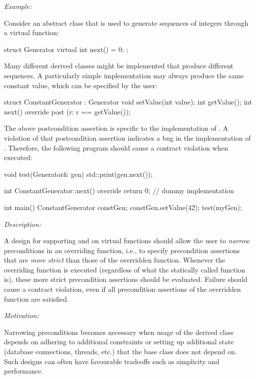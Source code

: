 \emph{Example:}

Consider an abstract class that is used to generate sequences of integers through a virtual function:

\begin{codeblock}
struct Generator {
  virtual int next() = 0;
};
\end{codeblock}
Many different derived classes might be implemented that produce different sequences. A particularly simple implementation may always produce the same constant value, which can be specified by the user:
\begin{codeblock}
struct ConstantGenerator : Generator {
  void setValue(int value);
  int getValue(); 
  int next() override
    post (r: r == getValue());
}
\end{codeblock}
The above postcondition assertion is specific to the implementation of \allowbreak{}. A violation of that postcondition assertion indicates a bug in the implementation of . Therefore, the following program should cause a contract violation when executed:
\begin{codeblock}
void test(Generator& gen) {
  std::print(gen.next());
}

int ConstantGenerator::next() override {
  return 0;  // dummy implementation  
} 

int main() {
  ConstantGenerator constGen;
  constGen.setValue(42);
  test(myGen);
}
\end{codeblock}



\emph{Description:}

A design for supporting  and  on virtual functions should allow the user to \emph{narrow} preconditions in an overriding function, i.e., to specify precondition assertions 
 that are \emph{more strict} than those of the overridden function. Whenever the overriding function is executed (regardless of what the statically called function is), these more strict precondition assertions should be evaluated. Failure should cause a contract violation, even if all precondition assertions of the overridden function are satisfied.
 
 \emph{Motivation:}
 
Narrowing preconditions becomes necessary when usage of the derived class depends on adhering to additional constraints or setting up additional state (database connections, threads, etc.) that the base class does not depend on.  Such designs can often have favourable tradeoffs such as simplicity and performance.

